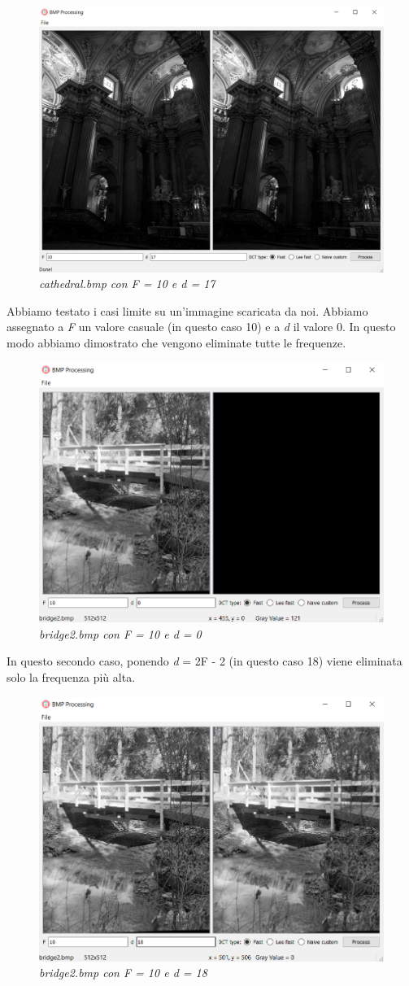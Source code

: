 \documentclass[a4paper,12pt]{report}
\begin{document}
\begin{figure}[H]
\centering
\includegraphics[width=0.65\linewidth]{../img/cathedral_10_17.png}
\caption{\textit{cathedral.bmp con F = 10 e d = 17}}
\end{figure}

\newpage

\noindent Abbiamo testato i casi limite su un'immagine scaricata da noi. Abbiamo assegnato a \textit{F} un valore casuale (in questo caso 10) e a \textit{d} il valore 0. In questo modo abbiamo dimostrato che vengono eliminate tutte le frequenze.

\begin{figure}[H]
\centering
\includegraphics[width=0.65\linewidth]{../img/bridge2_10_0.png}
\caption{\textit{bridge2.bmp con F = 10 e d = 0}}
\end{figure}

\noindent In questo secondo caso, ponendo \textit{d} = 2F - 2 (in questo caso 18) viene eliminata solo la frequenza più alta.

\begin{figure}[H]
\centering
\includegraphics[width=0.65\linewidth]{../img/bridge2_10_18.png}
\caption{\textit{bridge2.bmp con F = 10 e d = 18}}
\end{figure}
\printbibliography
\end{document}
